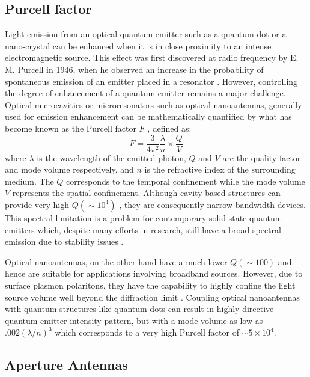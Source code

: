 \documentclass[11pt]{article}
\begin{document}
\subsection{Purcell factor}

Light emission from an optical quantum emitter such as a quantum dot or a nano-crystal can be enhanced when it is in close proximity to an intense electromagnetic source. This effect was first discovered at radio frequency by E. M. Purcell in 1946, when he observed an increase in the probability of spontaneous emission of an emitter placed in a resonator \cite{Purcell1946}. However, controlling the degree of enhancement of a quantum emitter remains a major challenge. Optical microcavities or microresonators such as optical nanoantennas, generally used for emission enhancement can be mathematically quantified by what has become known as the Purcell factor $F$ \cite{Vahala2003}, defined as:
%
\begin{equation}
  F = \frac{3}{4 \pi^2} \frac{ \lambda}{n} \times \frac{Q}{V}
  \label{eq:purcell}
\end{equation}
%
where $\lambda$ is the wavelength of the emitted photon, $Q$ and $V$ are the quality factor and mode volume respectively, and $n$ is the refractive index of the surrounding medium. The $Q$ corresponds to the temporal confinement while the mode volume $V$ represents the spatial confinement. Although cavity based structures can provide very high $Q (\sim 10^4)$ \cite{Song2005}, they are consequently narrow bandwidth devices. This spectral limitation is a problem for contemporary solid-state quantum emitters which, despite many efforts in research, still have a broad spectral emission due to stability issues \cite{Gaebel2004}.

Optical nanoantennas, on the other hand have a much lower $Q (\sim 100)$ \cite{curtothesis} and hence are suitable for applications involving broadband sources. However, due to surface plasmon polaritons, they have the capability to highly confine the light source volume well beyond the diffraction limit \cite{Maier2006,Barthes2011}. Coupling optical nanoantennas with quantum structures like quantum dots can result in highly directive quantum emitter intensity pattern, but with a mode volume as low as $.002 \left(\lambda/n \right)^3$ \cite{curtothesis} which corresponds to a very high Purcell factor of $\sim 5 \times 10^4$.
\subsection{Aperture Antennas}
\end{document}

